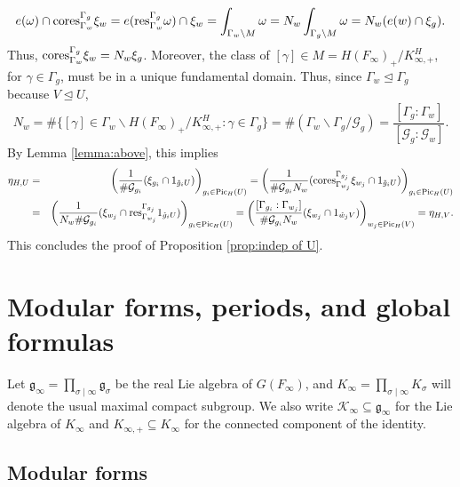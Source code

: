 \documentclass{amsart}
\theoremstyle{definition}
\theoremstyle{remark}
\numberwithin{equation}{section}
\newcommand{\cK}{{\mathcal K}}
\newcommand{\cG}{{\mathcal G}}
\newcommand{\mfg}{{\mathfrak g}}
\begin{document}
\[
e(\omega)\cap{\rm cores}_{\Gamma_{w}}^{\Gamma_g}\xi_w=e({\rm res}_{\Gamma_{w}}^{\Gamma_g}\omega)\cap\xi_w=\int_{\Gamma_w\backslash M}\omega=N_w\int_{\Gamma_g\backslash M}\omega=N_w(e(w)\cap\xi_g).
\]
Thus, ${\rm cores}_{\Gamma_{w}}^{\Gamma_{g}}\xi_{w}=N_w\xi_{g}$. Moreover, the class of $[\gamma]\in M=H(F_\infty)_+/K^H_{\infty,+}$, for $\gamma\in \Gamma_g$, must be in a unique fundamental domain.  Thus, since $\Gamma_w\unlhd\Gamma_g$ because $V\unlhd U$,
\[
N_w=\#\{[\gamma]\in \Gamma_{w}\backslash H(F_\infty)_+/K^H_{\infty,+}\colon \gamma\in\Gamma_g\}=\#\left(\Gamma_w\backslash\Gamma_g/\cG_g\right)=\frac{[\Gamma_g:\Gamma_w]}{[\cG_g:\cG_w]}.
\]
By Lemma \ref{lemma:above}, this implies
\begin{eqnarray*}
    \eta_{H,U}&=&\left(\frac{1}{\#\cG_{g_i}}(\xi_{g_i}\cap 1_{\tilde g_i U})\right)_{g_i\in {\rm Pic}_H(U)}=\left(\frac{1}{\#\cG_{g_i}N_w}({\rm cores}_{\Gamma_{w_j}}^{\Gamma_{g_j}}\xi_{w_j}\cap 1_{\tilde g_i U})\right)_{g_i\in {\rm Pic}_H(U)}\\
    &=&\left(\frac{1}{N_w\#\cG_{g_i}}(\xi_{w_j}\cap {\rm res}_{\Gamma_{w_j}}^{\Gamma_{g_j}}1_{\tilde g_i U})\right)_{g_i\in {\rm Pic}_H(U)}=\left(\frac{[\Gamma_{g_i}:\Gamma_{w_j}]}{\#\cG_{g_i}N_w}(\xi_{w_j}\cap 1_{\tilde w_j V})\right)_{w_j\in {\rm Pic}_H(V)}=\eta_{H,V}.
\end{eqnarray*}
This concludes the proof of Proposition \ref{prop:indep of U}.



\section{Modular forms, periods, and global formulas}\label{sec: global formulas}

Let $\mfg_\infty=\prod_{\sigma\mid\infty}\mfg_\sigma$ be the real Lie algebra of $G(F_\infty)$, and $K_\infty=\prod_{\sigma\mid\infty}K_\sigma$ will denote the usual maximal compact subgroup. We also write $\cK_\infty\subseteq \mfg_\infty$ for the Lie algebra of $K_\infty$ and $K_{\infty,+}\subseteq K_\infty$ for the connected component of the identity.

\subsection{Modular forms}
\end{document}
